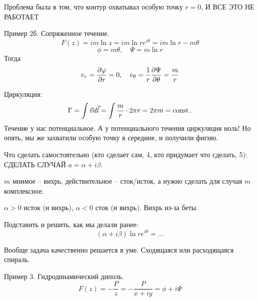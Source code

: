 Проблема была в том, что контур охватывал особую точку $r=0$, И ВСЕ ЭТО НЕ РАБОТАЕТ

Пример 2б. Сопряженное течение.
\begin{equation}
	F(z)=im\ln{z}=im\ln{re^{i \theta}}=im\ln{r}-m\theta
\end{equation}
\begin{equation}
	\phi=m\theta, \quad
	\Psi=m\ln{r}
\end{equation}
Тогда
\begin{equation}
	v_r=\pdv{\varphi}{r}=0, \quad
	v_\theta=\frac{1}{r}\pdv{\Psi}{\theta}=\frac{m}{r}
\end{equation}

\begin{comment}
Линии Psi=const   
   ______
  /      \
 /  ._.   \
/  /   \   \
|  |   |   |
\  \._./   /
 \        /
  \______/
\end{comment}

Циркуляция:
\begin{equation}
	\Gamma=\int \vec{v}d\vec{l}=\int \frac{m}{r}\cdot 2\pi r=2\pi m = \mathrm{const}\,.
\end{equation}
Течение у нас потенциальное. А у потенциального течения циркуляция ноль! Но опять, мы же захватили особую точку в середине, и получили фигню.

Что сделать самостоятельно (кто сделает сам, 4, кто придумает что сделать, 5): СДЕЛАТЬ СЛУЧАЙ $a=\alpha+i\beta$.

$m$ мнимое -- вихрь, действительное -- сток/исток, а нужно сделать для случая $m$ комплексное.

$\alpha>0$ исток (и вихрь), $\alpha<0$ сток (и вихрь). Вихрь из-за беты.

Подставить и решить, как мы делали ранее:
\begin{equation}
	(\alpha+i\beta)\ln{re^{i\theta}}=
		...
\end{equation}

Вообще задача качественно решается в уме. Сходящаяся или расходящаяся спираль.

Пример 3. Гидродинамический диполь.
\begin{equation}
	F(z)=-\frac{P}{z}=-\frac{P}{x+iy}=\phi+i\Psi
\end{equation}

\begin{comment}
	картинка диполя:
     __>___
 \	/ _>__ \ /
  \	|/    \|/
----*      *-------
  / |\_>__/|\
 /	\__>___/ \
\end{comment}

